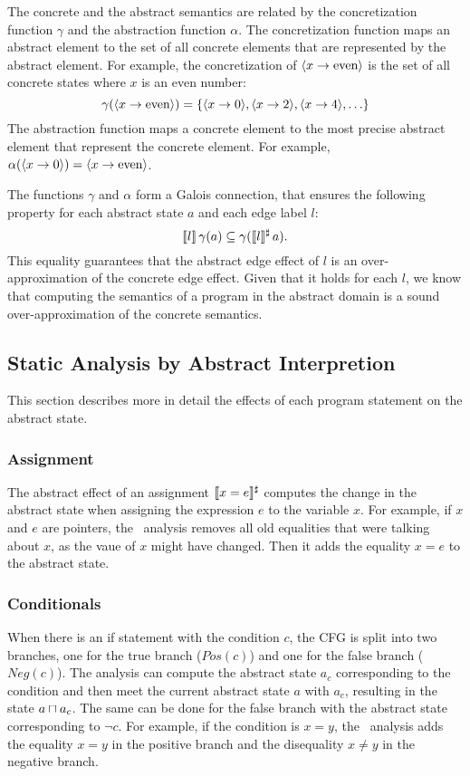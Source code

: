 The concrete and the abstract semantics are related by the concretization function $\gamma$ and the abstraction function $\alpha$.
The concretization function maps an abstract element to the set of all concrete elements that are represented by the abstract element.
For example, the concretization of $\langle x \rightarrow \text{even}\rangle$ is the set of all concrete states where $x$ is an even number:
\[
\gamma(\langle x \rightarrow \text{even}\rangle) = \{\langle x \rightarrow 0\rangle, \langle x \rightarrow 2\rangle, \langle x \rightarrow 4\rangle,\ldots\}
\]
The abstraction function maps a concrete element to the most precise abstract element that represent the concrete element. For example, $\alpha(\langle x \rightarrow 0\rangle) = \langle x \rightarrow \text{even}\rangle$.

The functions $\gamma$ and $\alpha$ form a Galois connection, that ensures the following property for each abstract state $a$ and each edge label $l$:
\[
\llbracket l\rrbracket\,\gamma(a) \subseteq \gamma(\llbracket l\rrbracket^\sharp\,a).
\]
This equality guarantees that the abstract edge effect of $l$ is an over-approximation
of the concrete edge effect.
Given that it holds for each $l$, we know that computing the semantics of a program in the abstract domain is a sound
over-approximation of the concrete semantics.

\subsection{Static Analysis by Abstract Interpretion}

This section describes more in detail the effects of each program statement on the abstract state.
\subsubsection{Assignment}
The abstract effect of an assignment $\llbracket x = e\rrbracket^\sharp$ computes the change in the abstract state when assigning the expression $e$ to the variable $x$.
For example, if $x$ and $e$ are pointers, the \cpo\ analysis removes all old equalities that were talking about $x$, as the vaue of $x$ might have changed.
Then it adds the equality $x = e$ to the abstract state.
\subsubsection{Conditionals}
When there is an if statement with the condition $c$, the CFG is split into two branches, one for the true branch ($Pos(c)$) and one for the false branch ($Neg(c)$).
The analysis can compute the abstract state $a_c$ corresponding to the condition and
then meet the current abstract state $a$ with $a_c$, resulting in the state $a \sqcap a_c$.
The same can be done for the false branch with the abstract state corresponding to $\neg c$.
For example, if the condition is $x = y$, the \cpo\ analysis adds the equality $x = y$
in the positive branch and the disequality $x \neq y$ in the negative branch.
